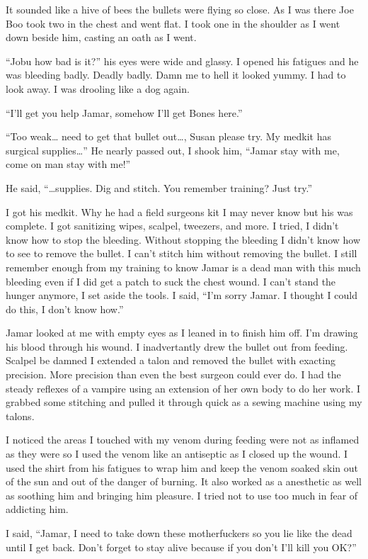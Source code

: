 It sounded like a hive of bees the bullets were flying so close. As I was there Joe Boo took two in the chest and went flat. I took one in the shoulder as I went down beside him, casting an oath as I went.

``Jobu how bad is it?'' his eyes were wide and glassy. I opened his fatigues and he was bleeding badly. Deadly badly. Damn me to hell it looked yummy. I had to look away. I was drooling like a dog again.

``I'll get you help Jamar, somehow I'll get Bones here.''

``Too weak\dots{} need to get that bullet out\dots{}, Susan please try. My medkit has surgical supplies\dots{}'' He nearly passed out, I shook him, ``Jamar stay with me, come on man stay with me!''

He said, ``\dots{}supplies. Dig and stitch. You remember training? Just try.''

I got his medkit. Why he had a field surgeons kit I may never know but his was complete. I got sanitizing wipes, scalpel, tweezers, and more. I tried, I didn't know how to stop the bleeding. Without stopping the bleeding I didn't know how to see to remove the bullet. I can't stitch him without removing the bullet. I still remember enough from my training to know Jamar is a dead man with this much bleeding even if I did get a patch to suck the chest wound. I can't stand the hunger anymore, I set aside the tools. I said, ``I'm sorry Jamar. I thought I could do this, I don't know how.''

Jamar looked at me with empty eyes as I leaned in to finish him off. I'm drawing his blood through his wound. I inadvertantly drew the bullet out from feeding. Scalpel be damned I extended a talon and removed the bullet with exacting precision. More precision than even the best surgeon could ever do. I had the steady reflexes of a vampire using an extension of her own body to do her work. I grabbed some stitching and pulled it through quick as a sewing machine using my talons.

I noticed the areas I touched with my venom during feeding were not as inflamed as they were so I used the venom like an antiseptic as I closed up the wound. I used the shirt from his fatigues to wrap him and keep the venom soaked skin out of the sun and out of the danger of burning. It also worked as a anesthetic as well as soothing him and bringing him pleasure. I tried not to use too much in fear of addicting him.

I said, ``Jamar, I need to take down these motherfuckers so you lie like the dead until I get back. Don't forget to stay alive because if you don't I'll kill you OK?''


